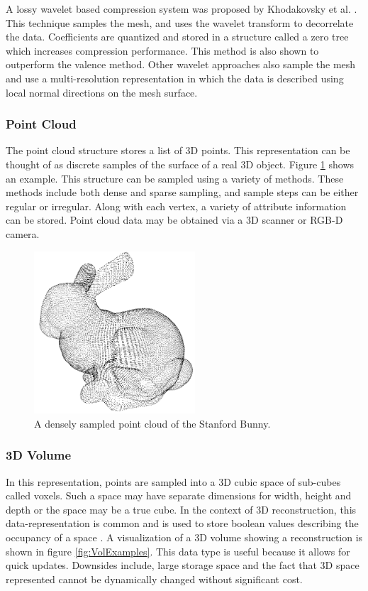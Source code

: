 A lossy wavelet based compression system was proposed by Khodakovsky et al. \cite{Khodakovsky00Progressive}. This technique samples the mesh, and uses the wavelet transform to decorrelate the data. Coefficients are quantized and stored in a structure called a zero tree which increases compression performance. This method is also shown to outperform the valence method. Other wavelet approaches \cite{Guskov00Normal,Khodakovsky04Normalmesh} also sample the mesh and use a multi-resolution representation in which the data is described using local normal directions on the mesh surface. \\


\subsubsection{Point Cloud}

The point cloud structure stores a list of 3D points. This representation can be thought of as discrete samples of the surface of a real 3D object. Figure \ref{PointCloudExample} shows an example. This structure can be sampled using a variety of methods. These methods include both dense and sparse sampling, and sample steps can be either regular or irregular. Along with each vertex, a variety of attribute information can be stored. Point cloud data may be obtained via a 3D scanner or RGB-D camera. 

\begin{figure}[!htb]
\centering
\includegraphics[width=6cm]{images/ch2/PointCloudExample}
\caption{A densely sampled point cloud of the Stanford Bunny.}
\label{PointCloudExample}
\end{figure}


\subsubsection{3D Volume}

In this representation, points are sampled into a 3D cubic space of sub-cubes called voxels. Such a space may have separate dimensions for width, height and depth or the space may be a true cube. In the context of 3D reconstruction, this data-representation is common and is used to store boolean values describing the occupancy of a space \cite{Rusinkiewicz02Real}. A visualization of a 3D volume showing a reconstruction is shown in figure \ref{fig:VolExamples}. This data type is useful because it allows for quick updates. Downsides include, large storage space and the fact that 3D space represented cannot be dynamically changed without significant cost. \\


